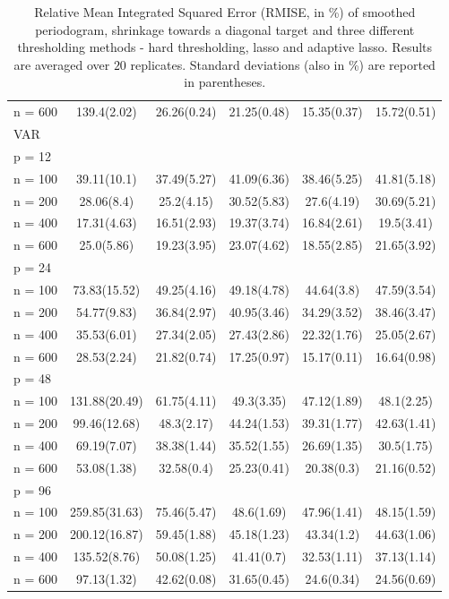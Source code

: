 \begin{table}
\begin{tabular}{l@{\hskip 0.4in}ccccc}
\multicolumn{1}{r}{n = 600}&139.4(2.02)&26.26(0.24)&21.25(0.48)&15.35(0.37)&15.72(0.51)\\
VAR & & & & &\\
p = 12 & & & & &\\
\multicolumn{1}{r}{n = 100}&39.11(10.1)&37.49(5.27)&41.09(6.36)&38.46(5.25)&41.81(5.18)\\
\multicolumn{1}{r}{n = 200}&28.06(8.4)&25.2(4.15)&30.52(5.83)&27.6(4.19)&30.69(5.21)\\
\multicolumn{1}{r}{n = 400}&17.31(4.63)&16.51(2.93)&19.37(3.74)&16.84(2.61)&19.5(3.41)\\
\multicolumn{1}{r}{n = 600}&25.0(5.86)&19.23(3.95)&23.07(4.62)&18.55(2.85)&21.65(3.92)\\
p = 24 & & & & &\\
\multicolumn{1}{r}{n = 100}&73.83(15.52)&49.25(4.16)&49.18(4.78)&44.64(3.8)&47.59(3.54)\\
\multicolumn{1}{r}{n = 200}&54.77(9.83)&36.84(2.97)&40.95(3.46)&34.29(3.52)&38.46(3.47)\\
\multicolumn{1}{r}{n = 400}&35.53(6.01)&27.34(2.05)&27.43(2.86)&22.32(1.76)&25.05(2.67)\\
\multicolumn{1}{r}{n = 600}&28.53(2.24)&21.82(0.74)&17.25(0.97)&15.17(0.11)&16.64(0.98)\\
p = 48 & & & & &\\
\multicolumn{1}{r}{n = 100}&131.88(20.49)&61.75(4.11)&49.3(3.35)&47.12(1.89)&48.1(2.25)\\
\multicolumn{1}{r}{n = 200}&99.46(12.68)&48.3(2.17)&44.24(1.53)&39.31(1.77)&42.63(1.41)\\
\multicolumn{1}{r}{n = 400}&69.19(7.07)&38.38(1.44)&35.52(1.55)&26.69(1.35)&30.5(1.75)\\
\multicolumn{1}{r}{n = 600}&53.08(1.38)&32.58(0.4)&25.23(0.41)&20.38(0.3)&21.16(0.52)\\
p = 96 & & & & &\\
\multicolumn{1}{r}{n = 100}&259.85(31.63)&75.46(5.47)&48.6(1.69)&47.96(1.41)&48.15(1.59)\\
\multicolumn{1}{r}{n = 200}&200.12(16.87)&59.45(1.88)&45.18(1.23)&43.34(1.2)&44.63(1.06)\\
\multicolumn{1}{r}{n = 400}&135.52(8.76)&50.08(1.25)&41.41(0.7)&32.53(1.11)&37.13(1.14)\\
\multicolumn{1}{r}{n = 600}&97.13(1.32)&42.62(0.08)&31.65(0.45)&24.6(0.34)&24.56(0.69)\\
\end{tabular}
\label{table:rmise-homogeneous-final}
\caption{Relative Mean Integrated Squared Error (RMISE, in \%) of smoothed periodogram, shrinkage towards a diagonal target and three different thresholding methods - hard thresholding, lasso and adaptive lasso. Results are averaged over $20$ replicates. Standard deviations (also in \%) are reported in parentheses.}
\end{table}